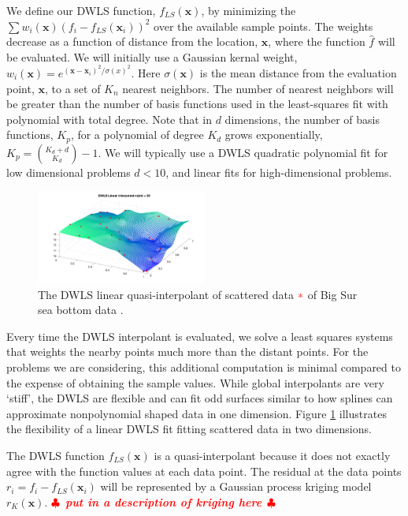 \documentclass[11pt]{NSFamsart}
\newcommand{\bx}{{\boldsymbol{x}}}
\newif\ifnotesw \noteswtrue
\newcommand{\notes}[1]{\ifnotesw \textcolor{red}{  $\clubsuit$\ {\sf \bf \it  #1}\ $\clubsuit$  }\fi}
\begin{document}
We define our DWLS function, $f_{LS}(\bx)$, by minimizing the $\sum w_i(\bx) (f_i - f_{LS}(\bx_i))^2$ over the available sample points.  The weights decrease as a function of distance from the location, $\bx$, where the function $\hat f$ will be evaluated.   We will initially use a Gaussian kernal weight, 
$w_i(\bx) = e^{(\bx-\bx_i)^2/\sigma(x)^2}$.  
Here $\sigma(\bx)$ is the mean distance from the evaluation point, $\bx$, to a set of $K_n$ nearest neighbors.  The number of nearest neighbors will be greater than the number of basis functions used in the least-squares fit with polynomial with total degree.  Note that in $d$ dimensions, the number of basis functions, $K_p$,  for a polynomial of degree $K_d$ grows exponentially, $K_p={K_d + d \choose K_d} -1$.  
We will typically use a DWLS quadratic polynomial fit for low dimensional problems $d<10$, and linear fits for high-dimensional problems.    

\begin{figure}
	  \begin{center}
	\includegraphics[width = 0.5\textwidth]{ProgramsImages/bigsurT.pdf}
	 \end{center}
	\caption{The  DWLS linear quasi-interpolant of scattered data {$\color{red}*$} of  Big Sur sea bottom data \cite{franke1979critical}.
	\label{DWLS}}
\end{figure}
Every time the DWLS interpolant is evaluated, we  solve a least squares systems that  weights the nearby points much more than the distant points.  For the problems we are considering, this additional computation is minimal compared to the expense of obtaining the sample values.  While global interpolants are very `stiff', the DWLS are flexible and can fit odd surfaces similar to how splines can approximate nonpolynomial shaped data in one dimension.  
 Figure \ref{DWLS} illustrates the flexibility of a linear DWLS fit fitting scattered data in two dimensions.  



The DWLS function $f_{LS}(\bx)$ is a quasi-interpolant because it does not exactly agree with the function values at each data point.  The residual at the data points $r_i = f_i - f_{LS}(\bx_i)$ will be represented by a Gaussian process kriging model $r_{K}(\bx)$.
\notes{put in a description of kriging here}
\end{document}
